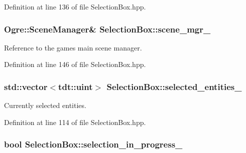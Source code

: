 Definition at line 136 of file Selection\+Box.\+hpp.

\subsubsection[{\texorpdfstring{scene\+\_\+mgr\+\_\+}{scene_mgr_}}]{\setlength{\rightskip}{0pt plus 5cm}Ogre\+::\+Scene\+Manager\& Selection\+Box\+::scene\+\_\+mgr\+\_\+\hspace{0.3cm}{\ttfamily [private]}}\hypertarget{class_selection_box_a4b844958cbf4e43926e44508c62476af}{}\label{class_selection_box_a4b844958cbf4e43926e44508c62476af}


Reference to the game\textquotesingle{}s main scene manager. 



Definition at line 146 of file Selection\+Box.\+hpp.

\subsubsection[{\texorpdfstring{selected\+\_\+entities\+\_\+}{selected_entities_}}]{\setlength{\rightskip}{0pt plus 5cm}std\+::vector$<$tdt\+::uint$>$ Selection\+Box\+::selected\+\_\+entities\+\_\+\hspace{0.3cm}{\ttfamily [private]}}\hypertarget{class_selection_box_a47f43b49a4eeab82ac9c0423b689d8c7}{}\label{class_selection_box_a47f43b49a4eeab82ac9c0423b689d8c7}


Currently selected entities. 



Definition at line 114 of file Selection\+Box.\+hpp.

\subsubsection[{\texorpdfstring{selection\+\_\+in\+\_\+progress\+\_\+}{selection_in_progress_}}]{\setlength{\rightskip}{0pt plus 5cm}bool Selection\+Box\+::selection\+\_\+in\+\_\+progress\+\_\+\hspace{0.3cm}{\ttfamily [private]}}\hypertarget{class_selection_box_ae814ae0409771480132a038d4082fe97}{}\label{class_selection_box_ae814ae0409771480132a038d4082fe97}


